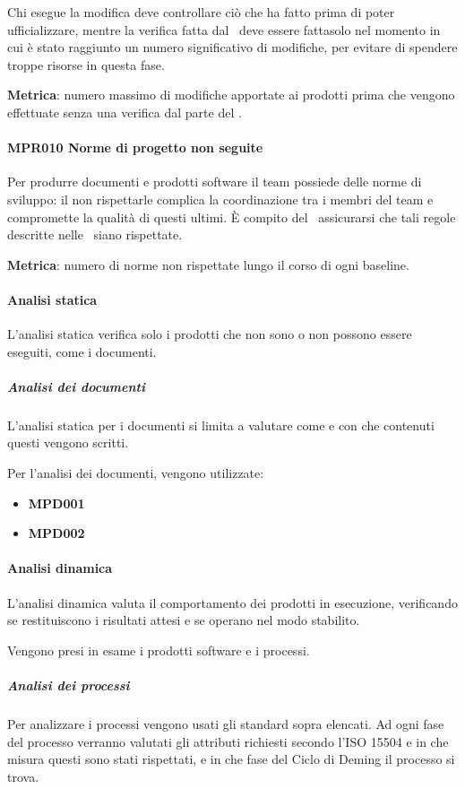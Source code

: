 				Chi esegue la modifica deve controllare ciò che ha fatto prima di poter ufficializzare, mentre la verifica fatta dal \Ver\ deve essere fattasolo nel momento in cui è
				stato raggiunto un numero significativo di modifiche, per evitare di spendere troppe risorse in questa fase.

				\textbf{Metrica}: numero massimo di modifiche apportate ai prodotti prima che vengono effettuate senza una verifica dal parte del \Ver.

				\paragraph{MPR010 Norme di progetto non seguite}
				Per produrre documenti e prodotti software il team possiede delle norme di sviluppo: il non rispettarle complica la coordinazione tra i membri del
				team e compromette la qualità di questi ultimi. \`E compito del \Res\ assicurarsi che tali regole descritte nelle \NdP\ siano rispettate.

				\textbf{Metrica}: numero di norme non rispettate lungo il corso di ogni baseline.

			\paragraph{Analisi statica}
			L'analisi statica verifica solo i prodotti che non sono o non possono essere eseguiti, come i documenti.

				\subparagraph{Analisi dei documenti}
				L'analisi statica per i documenti si limita a valutare come e con che contenuti questi vengono scritti.

				Per l'analisi dei documenti, vengono utilizzate:

				\begin{itemize}
					\item \textbf{MPD001}
					\item \textbf{MPD002}
				\end{itemize}

			\paragraph{Analisi dinamica}
			L'analisi dinamica valuta il comportamento dei prodotti in esecuzione, verificando se restituiscono i risultati attesi e se operano nel modo stabilito.

			Vengono presi in esame i prodotti software e i processi.

				\subparagraph{Analisi dei processi}
				Per analizzare i processi vengono usati gli standard sopra elencati. Ad ogni fase del processo verranno valutati gli attributi richiesti secondo l'ISO 15504
				e in che misura questi sono stati rispettati, e in che fase del Ciclo di Deming il processo si trova.

